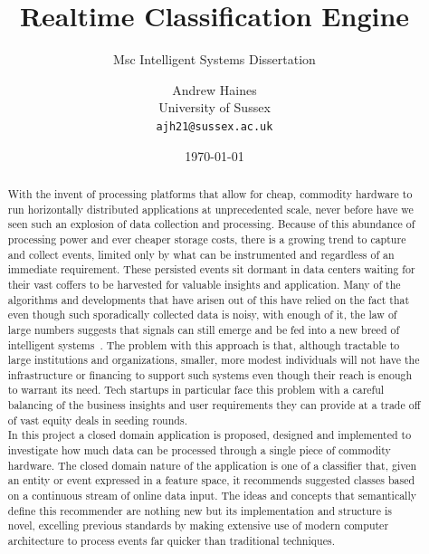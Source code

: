 \documentclass[a4paper,11pt]{scrreprt}
\begin{document}
\title{Realtime Classification Engine}
\subtitle{Msc Intelligent Systems Dissertation}
\author{Andrew Haines\\
	University of Sussex\\
	\texttt{ajh21@sussex.ac.uk}}

\date{\today}
\maketitle

\begin{abstract}
With the invent of processing platforms that allow for cheap, commodity hardware to run horizontally distributed applications at unprecedented scale, never before have we seen such an explosion of data collection and processing. Because of this abundance of processing power and ever cheaper storage costs, there is a growing trend to capture and collect events, limited only by what can be instrumented and regardless of an immediate requirement. These persisted events sit dormant in data centers waiting for their vast coffers to be harvested for valuable insights and application. Many of the algorithms and developments that have arisen out of this have relied on the fact that even though such sporadically collected data is noisy, with enough of it, the law of large numbers suggests that signals can still emerge and be fed into a new breed of intelligent systems~\cite{bigdata}. The problem with this approach is that, although tractable to large institutions and organizations, smaller, more modest individuals will not have the infrastructure or financing to support such systems even though their reach is enough to warrant its need. Tech startups in particular face this problem with a careful balancing of the business insights and user requirements they can provide at a trade off of vast equity deals in seeding rounds.\\

In this project a closed domain application is proposed, designed and implemented to investigate how much data can be processed through a single piece of commodity hardware. The closed domain nature of the application is one of a classifier that, given an entity or event expressed in a feature space, it recommends suggested classes based on a continuous stream of online data input. The ideas and concepts that semantically define this recommender are nothing new but its implementation and structure is novel, excelling previous standards by making extensive use of modern computer architecture to process events far quicker than traditional techniques.

\end{abstract}
\end{document}
